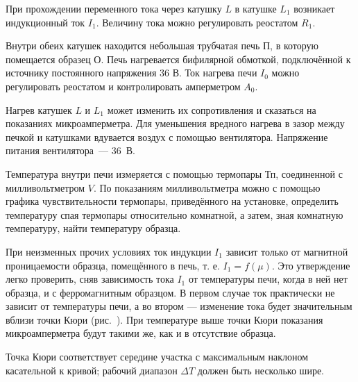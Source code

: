При прохождении переменного тока через катушку $L$ в катушке $L_1$ возникает индукционный ток $I_1$. Величину тока можно регулировать реостатом $R_1$.

Внутри обеих катушек находится небольшая трубчатая печь $\text{П}$, в которую помещается образец $\text{О}$. Печь нагревается бифилярной обмоткой, подключённой к источнику постоянного напряжения 36 В. Ток нагрева печи $I_0$ можно
регулировать реостатом и контролировать амперметром $A_0$.

Нагрев катушек $L$ и $L_1$ может изменить их сопротивления и сказаться на показаниях микроамперметра. Для уменьшения
вредного нагрева в зазор между печкой и катушками вдувается воздух с помощью вентилятора. Напряжение питания вентилятора~--- 36~В.

Температура внутри печи измеряется с помощью термопары $\text{Тп}$, соединенной с милливольтметром $V$. По показаниям милливольтметра можно с помощью графика чувствительности термопары, приведённого на установке, определить температуру спая термопары относительно комнатной, а затем, зная комнатную температуру, найти температуру образца.

При неизменных прочих условиях ток индукции $I_1$ зависит только от магнитной проницаемости образца, помещённого в печь, т. е. $I_1 = f(\mu)$. Это утверждение легко проверить, сняв зависимость тока $I_1$ от температуры печи, когда в ней нет образца, и с ферромагнитным образцом. В первом случае ток практически не зависит от температуры печи, а во втором --- изменение тока будет значительным вблизи точки Кюри (рис.~). При температуре выше точки Кюри показания микроамперметра будут такими же, как и в отсутствие образца.

Точка Кюри соответствует середине участка с максимальным наклоном касательной к кривой; рабочий диапазон $\Delta T$ должен быть несколько шире.

